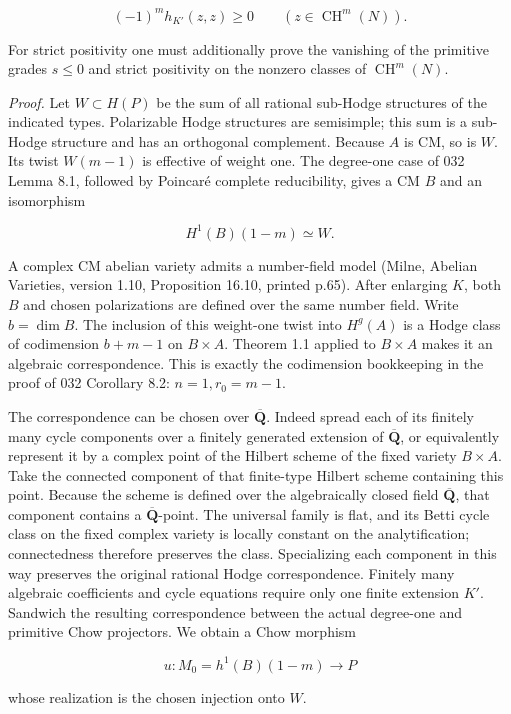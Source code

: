 \[
(-1)^m h_{K'}(z,z)\ge0
\qquad(z\in\operatorname{CH}^m(N)).
\tag{AR-GATE}
\]

For strict positivity one must additionally prove the vanishing of the
primitive grades \(s\le0\) and strict positivity on the nonzero classes
of \(\operatorname{CH}^m(N)\).

\emph{Proof.} Let \(W\subset H(P)\) be the sum of all rational sub-Hodge
structures of the indicated types. Polarizable Hodge structures are
semisimple; this sum is a sub-Hodge structure and has an orthogonal
complement. Because \(A\) is CM, so is \(W\). Its twist \(W(m-1)\) is
effective of weight one. The degree-one case of 032 Lemma 8.1, followed
by Poincaré complete reducibility, gives a CM \(B\) and an isomorphism

\[
H^1(B)(1-m)\simeq W.
\]

A complex CM abelian variety admits a number-field model (Milne, Abelian
Varieties, version 1.10, Proposition 16.10, printed p.65). After
enlarging \(K\), both \(B\) and chosen polarizations are defined over
the same number field. Write \(b=\dim B\). The inclusion of this
weight-one twist into \(H^g(A)\) is a Hodge class of codimension
\(b+m-1\) on \(B\times A\). Theorem 1.1 applied to \(B\times A\) makes
it an algebraic correspondence. This is exactly the codimension
bookkeeping in the proof of 032 Corollary 8.2: \(n=1,r_0=m-1\).

The correspondence can be chosen over \(\overline{\mathbf Q}\). Indeed
spread each of its finitely many cycle components over a finitely
generated extension of \(\overline{\mathbf Q}\), or equivalently
represent it by a complex point of the Hilbert scheme of the fixed
variety \(B\times A\). Take the connected component of that finite-type
Hilbert scheme containing this point. Because the scheme is defined over
the algebraically closed field \(\overline{\mathbf Q}\), that component
contains a \(\overline{\mathbf Q}\)-point. The universal family is flat,
and its Betti cycle class on the fixed complex variety is locally
constant on the analytification; connectedness therefore preserves the
class. Specializing each component in this way preserves the original
rational Hodge correspondence. Finitely many algebraic coefficients and
cycle equations require only one finite extension \(K'\). Sandwich the
resulting correspondence between the actual degree-one and primitive
Chow projectors. We obtain a Chow morphism

\[
u:M_0=h^1(B)(1-m)\longrightarrow P
\]

whose realization is the chosen injection onto \(W\).

